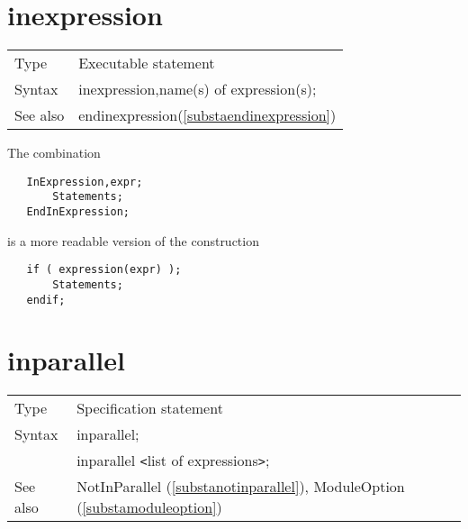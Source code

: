  \vspace{10mm}

 
\section{inexpression}
\label{substainexpression}

\noindent \begin{tabular}{ll}
Type & Executable statement\\
Syntax & inexpression,name(s) of expression(s);
\\ See also & endinexpression(\ref{substaendinexpression})
\end{tabular} \vspace{4mm}

\noindent The combination
\begin{verbatim}
   InExpression,expr;
       Statements;
   EndInExpression;
\end{verbatim}
is a more readable version of the construction
\begin{verbatim}
   if ( expression(expr) );
       Statements;
   endif;
\end{verbatim}
\vspace{10mm}


\section{inparallel}
\label{substainparallel}

\noindent \begin{tabular}{ll}
Type & Specification statement\\
Syntax & inparallel; \\
       & inparallel {\tt<}list of expressions{\tt>};
\\ See also & NotInParallel (\ref{substanotinparallel}), 
     ModuleOption (\ref{substamoduleoption})
\end{tabular} \vspace{4mm}

